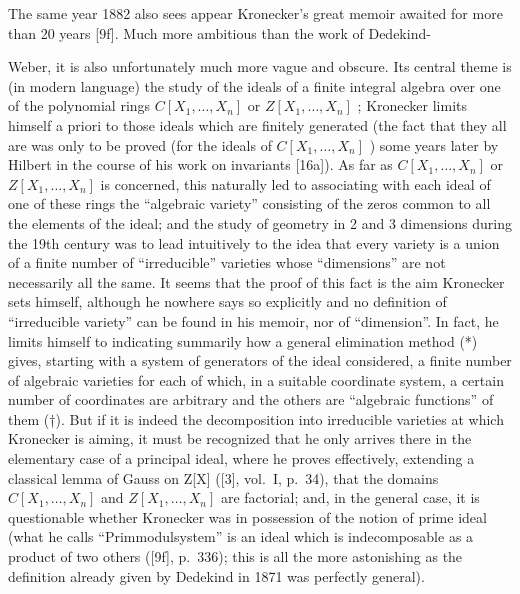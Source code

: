 The same year 1882 also sees appear Kronecker's great memoir awaited for more than 20 years {[}9f{]}. Much more ambitious than the work of Dedekind-

Weber, it is also unfortunately much more vague and obscure. Its central theme is (in modern language) the study of the ideals of a finite integral algebra over one of the polynomial rings \(C[X_{1},\ldots,X_{n}]\) or \(Z[X_{1},\ldots,X_{n}]\) ; Kronecker limits himself a priori to those ideals which are finitely generated (the fact that they all are was only to be proved (for the ideals of \(C[X_{1},\ldots,X_{n}]\) ) some years later by Hilbert in the course of his work on invariants {[}16a{]}). As far as \(C[X_{1},\ldots,X_{n}]\) or \(Z[X_{1},\ldots,X_{n}]\) is concerned, this naturally led to associating with each ideal of one of these rings the ``algebraic variety'' consisting of the zeros common to all the elements of the ideal; and the study of geometry in 2 and 3 dimensions during the 19th century was to lead intuitively to the idea that every variety is a union of a finite number of ``irreducible'' varieties whose ``dimensions'' are not necessarily all the same. It seems that the proof of this fact is the aim Kronecker sets himself, although he nowhere says so explicitly and no definition of ``irreducible variety'' can be found in his memoir, nor of ``dimension''. In fact, he limits himself to indicating summarily how a general elimination method (*) gives, starting with a system of generators of the ideal considered, a finite number of algebraic varieties for each of which, in a suitable coordinate system, a certain number of coordinates are arbitrary and the others are ``algebraic functions'' of them (†). But if it is indeed the decomposition into irreducible varieties at which Kronecker is aiming, it must be recognized that he only arrives there in the elementary case of a principal ideal, where he proves effectively, extending a classical lemma of Gauss on Z{[}X{]} ({[}3{]}, vol.~I, p.~34), that the domains \(C[X_{1},\ldots,X_{n}]\) and \(Z[X_{1},\ldots,X_{n}]\) are factorial; and, in the general case, it is questionable whether Kronecker was in possession of the notion of prime ideal (what he calls ``Primmodulsystem'' is an ideal which is indecomposable as a product of two others ({[}9f{]}, p.~336); this is all the more astonishing as the definition already given by Dedekind in 1871 was perfectly general).

